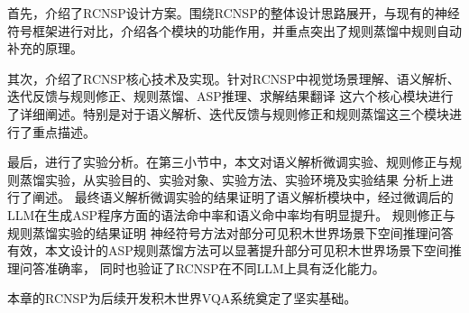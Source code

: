 首先，介绍了RCNSP设计方案。围绕RCNSP的整体设计思路展开，与现有的神经符号框架进行对比，介绍各个模块的功能作用，并重点突出了规则蒸馏中规则自动补充的原理。

其次，介绍了RCNSP核心技术及实现。针对RCNSP中视觉场景理解、语义解析、迭代反馈与规则修正、规则蒸馏、ASP推理、求解结果翻译
这六个核心模块进行了详细阐述。特别是对于语义解析、迭代反馈与规则修正和规则蒸馏这三个模块进行了重点描述。

最后，进行了实验分析。在第三小节中，本文对语义解析微调实验、规则修正与规则蒸馏实验，从实验目的、实验对象、实验方法、实验环境及实验结果
分析上进行了阐述。
最终语义解析微调实验的结果证明了语义解析模块中，经过微调后的LLM在生成ASP程序方面的语法命中率和语义命中率均有明显提升。
规则修正与规则蒸馏实验的结果证明
神经符号方法对部分可见积木世界场景下空间推理问答有效，本文设计的ASP规则蒸馏方法可以显著提升部分可见积木世界场景下空间推理问答准确率，
同时也验证了RCNSP在不同LLM上具有泛化能力。

本章的RCNSP为后续开发积木世界VQA系统奠定了坚实基础。